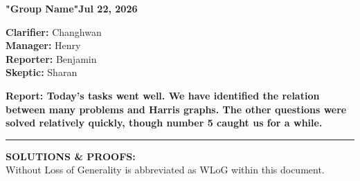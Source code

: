 \documentclass[11pt]{article}
\theoremstyle{solstyle}
\begin{document}
\noindent\textbf{"Group Name"}\hfill\textbf{Jul 22, 2026}

\noindent\textbf{Clarifier:} Changhwan\\
\textbf{Manager:} Henry\\
\textbf{Reporter:} Benjamin\\
\textbf{Skeptic:} Sharan

\textbf{Report: Today's tasks went well. We have identified the relation between many problems and Harris graphs. The other questions were solved relatively quickly, though number 5 caught us for a while. } 

\begin{center}\rule{0.6\textwidth}{0.4pt}\end{center}

\textbf{SOLUTIONS \& PROOFS:} \\
Without Loss of Generality is abbreviated as WLoG within this document. 
\end{document}
